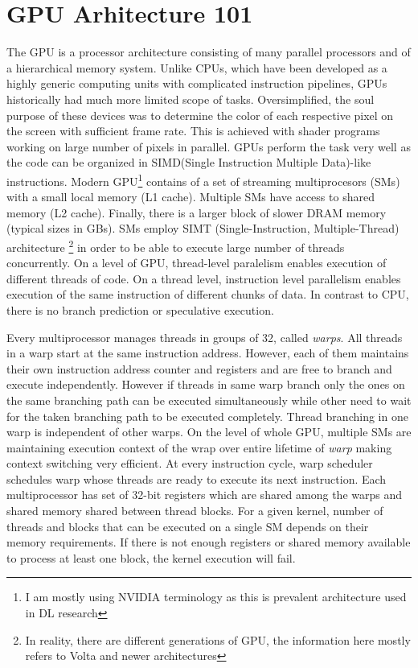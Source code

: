 \documentclass{article}
\begin{document}
\section{GPU Arhitecture 101}

The GPU is a processor architecture consisting of many parallel processors and of a hierarchical memory system. Unlike CPUs, which have been developed as a highly generic computing units with complicated instruction pipelines, GPUs
historically had much more limited scope of tasks. Oversimplified, the soul purpose of these devices was to
determine the color of each respective pixel on the screen with sufficient frame rate. This is achieved with shader programs working on large number of pixels in parallel. GPUs perform the task very well as the code can be organized in SIMD(Single Instruction Multiple Data)-like instructions. 
Modern GPU\footnote{I am mostly using NVIDIA terminology as this is prevalent architecture used in DL research} contains of a set of streaming multiprocesors (SMs) with a small local memory (L1 cache). Multiple SMs have access to shared memory (L2 cache). Finally, there is a larger block of slower DRAM memory (typical sizes in GBs). 
SMs employ SIMT (Single-Instruction, Multiple-Thread) architecture \footnote{In reality, there are different generations of GPU, the information here mostly refers to Volta and newer architectures} in order to be able to execute large number of threads concurrently. On a level of GPU, thread-level paralelism enables execution of different threads of code.
On a thread level, instruction level parallelism enables execution of the same instruction of different chunks of data. In contrast to CPU, there is no branch prediction or speculative execution.

Every multiprocessor manages threads in groups of 32, called \textit{warps}. All threads in a warp start at the same
instruction address. However, each of them maintains their own instruction address counter and registers and are free
to branch and execute independently. However if threads in same warp branch only the ones on the same branching path
can be executed simultaneously while other need to wait for the taken branching path to be executed completely.
Thread branching in one warp is independent of other warps.
On the level of whole GPU, multiple SMs are maintaining execution context of the wrap over entire lifetime of \textit{warp} making context switching very efficient. At every instruction cycle, warp scheduler schedules warp whose threads are ready to execute its next instruction. Each multiprocessor has set of 32-bit registers which are
shared among the warps and shared memory shared between thread blocks. For a given kernel, number of threads and blocks that can be executed on a single SM depends on their memory requirements. If there is not enough registers or
shared memory available to process at least one block, the kernel execution will fail.
\end{document}
